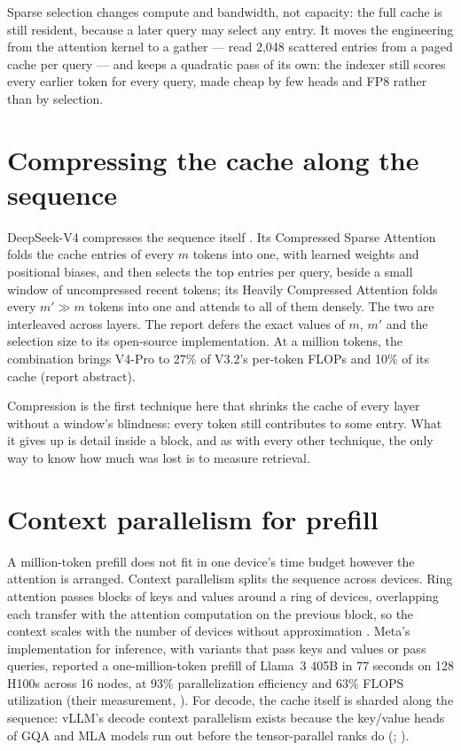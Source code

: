 Sparse selection changes compute and bandwidth, not capacity: the full cache
is still resident, because a later query may select any entry. It moves the
engineering from the attention kernel to a gather --- read 2,048 scattered
entries from a paged cache per query --- and keeps a quadratic pass of its own:
the indexer still scores every earlier token for every query, made cheap by
few heads and FP8 rather than by selection.

\section{Compressing the cache along the sequence}

DeepSeek-V4 compresses the sequence itself \cite{deepseek2026v4}. Its
Compressed Sparse Attention folds the cache entries of every $m$ tokens into
one, with learned weights and positional biases, and then selects the top
entries per query, beside a small window of uncompressed recent tokens; its
Heavily Compressed Attention folds every $m' \gg m$ tokens into one and attends
to all of them densely. The two are interleaved across layers. The report defers the
exact values of $m$, $m'$ and the selection size to its open-source
implementation. At a million tokens, the combination brings V4-Pro to 27\% of
V3.2's per-token FLOPs and 10\% of its cache (report abstract).

Compression is the first technique here that shrinks the cache of every
layer without a window's blindness: every token still contributes to some
entry. What it gives up is detail inside a block, and as with every other
technique, the only way to know how much was lost is to measure retrieval.

\section{Context parallelism for prefill}

A million-token prefill does not fit in one device's time budget however the
attention is arranged. Context parallelism splits the sequence across devices.
Ring attention passes blocks of keys and values around a ring of devices,
overlapping each transfer with the attention computation on the previous
block, so the context scales with the number of devices without approximation
\cite{liu2023ringattention}. Meta's implementation for inference, with
variants that pass keys and values or pass queries, reported a one-million-token
prefill of Llama~3 405B in 77 seconds on 128 H100s across 16 nodes, at 93\%
parallelization efficiency and 63\% FLOPS utilization (their measurement,
\cite{yang2024contextparallel}). For decode, the cache itself is sharded along
the sequence: vLLM's decode context parallelism exists because the key/value
heads of GQA and MLA models run out before the tensor-parallel ranks do
(; ).

